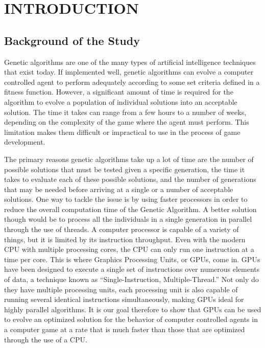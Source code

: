 \chapter{INTRODUCTION}

\section{Background of the Study}

Genetic algorithms are one of the many types of artificial intelligence
techniques that exist today. If implemented well, genetic algorithms can
evolve a computer controlled agent to perform adequately according to some
set criteria defined in a fitness function. However, a significant amount of 
time is required for the algorithm to evolve a population of individual solutions 
into an acceptable solution\cite{Schwab04}. The time it takes can range from
a few hours to a number of weeks, depending on the complexity of the game where
the agent must perform. This limitation makes them difficult or impractical to
use in the process of game development\cite{Schwab04}.

The primary reasons genetic algorithms take up a lot of time are the number of 
possible solutions that must be tested given a specific generation, the time it 
takes to evaluate each of these possible solutions, and the number of generations 
that may be needed before arriving at a single or a number of acceptable solutions\cite{Schwab04}. 
One way to tackle the issue is by using faster processors in order to reduce the
overall computation time of the Genetic Algorithm. A better solution though would
be to process all the individuals in a single generation in parallel through the
use of threads. A computer processor is capable of a variety of things, but it is limited by its instruction throughput. Even with the modern CPU with multiple processing cores, the CPU can only
run one instruction at a time per core. This is where Graphics Processing Units, or GPUs, come in.
GPUs have been designed to execute a single set of instructions over numerous elements
of data, a technique known as ``Single-Instruction, Multiple-Thread\cite{pdf:NVCudaPrgGuide}.''
Not only do they have multiple processing units, each processing unit is also
capable of running several identical instructions simultaneously, making GPUs ideal
for highly parallel algorithms\cite{pdf:NVCudaPrgGuide}. It is our goal therefore to
show that GPUs can be used to evolve an optimized solution for the behavior of computer
controlled agents in a computer game at a rate that is much faster than those that are optimized
through the use of a CPU.

